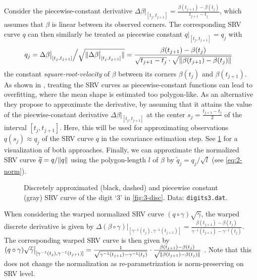 Consider the piecewise-constant derivative $\Delta \beta \big\rvert_{[t_j, t_{j+1}]} = \frac{\beta(t_{j+1}) - \beta(t_{j})}{t_{j+1} - t_j}$, which assumes that $\beta$ is linear between its observed corners. 
The corresponding SRV curve $q$ can then similarly be treated as piecewise constant $q\big\rvert_{[t_{j},t_{j+1}]} = q_j$ with 
\begin{equation}
  q_j = \Delta \beta \big\rvert_{[t_j, t_{j+1}]} \Big/ \sqrt{\lVert\Delta \beta \big\rvert_{[t_j, t_{j+1}]}\rVert} = \frac{\beta(t_{j+1}) - \beta(t_j)}{\sqrt{t_{j+1} - t_j} \cdot \sqrt{\lVert\beta(t_{j+1}) - \beta(t_j)\rVert}}
\end{equation}
the constant \emph{square-root-velocity} of $\beta$ between its corners $\beta(t_j)$ and $\beta(t_{j+1})$.
As shown in \cite[][Fig.\ 3]{Steyer2021}, treating the SRV curves as piecewise-constant functions can lead to overfitting, where the mean shape is estimated too polygon-like.
As an alternative they propose to approximate the derivative, by assuming that it attains the value of the piecwise-constant derivative $\Delta \beta \big\rvert_{[t_j,t_{j+1}]}$ at the center $s_j = \frac{t_{j+1} - t_j}{2}$ of the interval $[t_j, t_{j+1}]$.
Here, this will be used for approximating observations $q(s_j) \approx q_j$ of the SRV curve $q$ in the covariance estimation step.
See \cref{fig:3-disc-srv} for a visualization of both approaches.
Finally, we can approximate the normalized SRV curve $\widetilde q = q / \lVert q\rVert$ using the polygon-length $l$ of $\beta$ by $\widetilde q_j = q_j \big/ \sqrt{l}$ (see \cref{eq:2-norm}).
\begin{figure}
  \centering
  \begin{subfigure}{.48\textwidth}
    \centering
  \end{subfigure}\hfill%
  \begin{subfigure}{.48\textwidth}
    \centering
    \begin{subfigure}{\textwidth}
      \centering
    \end{subfigure}
    \begin{subfigure}{\textwidth}
      \centering
    \end{subfigure}
  \end{subfigure}
  \caption{Discretely approximated (black, dashed) and piecewise constant (gray) SRV curve of the digit \enquote*{3} in \cref{fig:3-disc}. Data: \texttt{digits3.dat}.}
  \label{fig:3-disc-srv}
\end{figure}
When considering the warped normalized SRV curve $(q \circ \gamma ) \sqrt{\dot\gamma}$, the warped discrete derivative is given by $\Delta (\beta \circ \gamma) \big\rvert_{[\gamma^{-1}(t_j), \gamma^{-1}(t_{j+1})]} = \frac{\beta(t_{j+1}) - \beta(t_{j})}{\gamma^{-1}(t_{j+1}) - \gamma^{-1}(t_j)}$.
The corresponding warped SRV curve is then given by $(q \circ \gamma) \sqrt{\dot\gamma} \big\rvert_{[\gamma^{-1}(t_j), \gamma^{-1}(t_{j+1})]} = \frac{1}{\sqrt{\gamma^{-1}(t_{j+1}) - \gamma^{-1}(t_j)}} \cdot \frac{\beta(t_{j+1}) - \beta(t_j)}{\sqrt{\lVert\beta(t_{j+1}) - \beta(t_j)\rVert}}$ \parencite[see][]{Steyer2021}.
Note that this does not change the normalization as re-parametrization is norm-preserving on SRV level.


